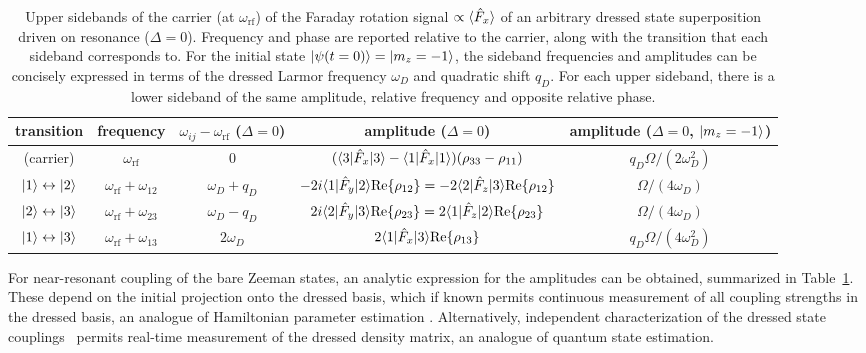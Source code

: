 \documentclass[aps,prl,reprint,superscriptaddress,floatfix]{revtex4-1}
\begin{document}
\begin{table*}[t]
    \caption{Upper sidebands of the carrier (at $\omega_{\text{rf}}$) of the Faraday rotation signal $\propto \langle \hat{F}_x \rangle$ of an arbitrary dressed state superposition driven on resonance ($\Delta = 0$).
    Frequency and phase are reported relative to the carrier, along with the transition that each sideband corresponds to.
    For the initial state $\vert \psi(t=0) \rangle =\vert m_z=-1 \rangle $, the sideband frequencies and amplitudes can be concisely expressed in terms of the dressed Larmor frequency $\omega_D$ and quadratic shift $q_D$. 
    For each upper sideband, there is a lower sideband of the same amplitude, relative frequency and opposite relative phase.
    \label{tab:sidebands}
    }
    \begin{ruledtabular}
    \begin{tabular}{ccccc}
    transition & frequency & $\omega_{ij} - \omega_{\text{rf}}$ ($\Delta=0$) & amplitude ($\Delta = 0$) & amplitude ($\Delta = 0$, $\vert m_z=-1 \rangle $) \\ \hline
     (carrier) & $\omega_{\text{rf}}$ & 0 & $(\langle 3 \vert  \hat{F}_x \vert 3 \rangle  - \langle 1 \vert  \hat{F}_x \vert 1 \rangle ) (\rho_{33} - \rho_{11})$  & $q_D \Omega/(2 \omega_D^2)$ \\
     $\vert 1 \rangle  \leftrightarrow \vert 2 \rangle $ & $\omega_{\text{rf}} + \omega_{12}$ & $\omega_D+q_D$ & $-2i \langle 1 \vert  \hat{F}_y \vert 2 \rangle  \text{Re}\{\rho_{12}\} = -2 \langle 2 \vert  \hat{F}_z \vert 3 \rangle  \text{Re}\{\rho_{12}\}$ & $\Omega/(4 \omega_D)$ \\
     $\vert 2 \rangle  \leftrightarrow \vert 3 \rangle $ & $\omega_{\text{rf}} + \omega_{23}$ & $\omega_D-q_D$ & $2i \langle 2 \vert  \hat{F}_y \vert 3 \rangle  \text{Re}\{\rho_{23}\} = 2 \langle 1 \vert  \hat{F}_z \vert 2 \rangle  \text{Re}\{\rho_{23}\}$ & $\Omega/(4 \omega_D)$ \\
     $\vert 1 \rangle  \leftrightarrow \vert 3 \rangle $ & $\omega_{\text{rf}} + \omega_{13}$ & $2\omega_D$ & $2 \langle 1 \vert  \hat{F}_x \vert 3 \rangle  \text{Re}\{\rho_{13}\}$ & $q_D \Omega/(4 \omega_D^2)$
    \end{tabular}
    \end{ruledtabular}
\end{table*}
For near-resonant coupling of the bare Zeeman states, an analytic expression for the amplitudes can be obtained, summarized in Table~\ref{tab:sidebands}.
These depend on the initial projection onto the dressed basis, which if known permits continuous measurement of all coupling strengths in the dressed basis, an analogue of Hamiltonian parameter estimation .
Alternatively, independent characterization of the dressed state couplings~\cite{lundblad_synthetic_2017} permits real-time measurement of the dressed density matrix, an analogue of quantum state estimation.
\end{document}

